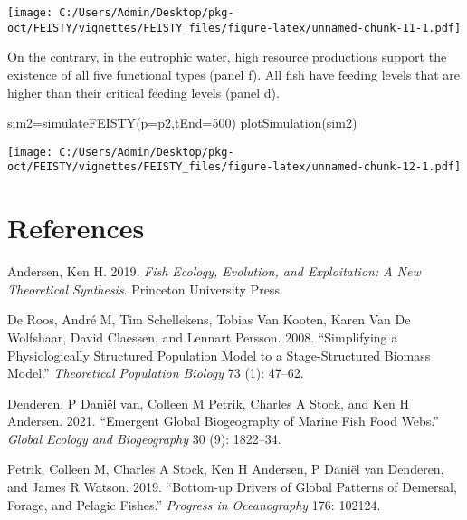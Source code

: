 \documentclass[
]{article}
\newenvironment{Shaded}{\begin{snugshade}}{\end{snugshade}}
\newcommand{\AttributeTok}[1]{\textcolor[rgb]{0.77,0.63,0.00}{#1}}
\newcommand{\DecValTok}[1]{\textcolor[rgb]{0.00,0.00,0.81}{#1}}
\newcommand{\FunctionTok}[1]{\textcolor[rgb]{0.00,0.00,0.00}{#1}}
\newcommand{\NormalTok}[1]{#1}
\newcommand{\OtherTok}[1]{\textcolor[rgb]{0.56,0.35,0.01}{#1}}
\newlength{\cslhangindent}
\newlength{\cslentryspacingunit} %
\newenvironment{CSLReferences}[2] %
 {%
  \setlength{\parindent}{0pt}
  \ifodd #1
  \let\oldpar\par
  \def\par{\hangindent=\cslhangindent\oldpar}
  \fi
  \setlength{\parskip}{#2\cslentryspacingunit}
 }%
 {}
\begin{document}
\texttt{[image: C:/Users/Admin/Desktop/pkg-oct/FEISTY/vignettes/FEISTY\_files/figure-latex/unnamed-chunk-11-1.pdf]}

On the contrary, in the eutrophic water, high resource productions
support the existence of all five functional types (panel f). All fish
have feeding levels that are higher than their critical feeding levels
(panel d).

\begin{Shaded}
\begin{Highlighting}[]
\NormalTok{sim2}\OtherTok{=}\FunctionTok{simulateFEISTY}\NormalTok{(}\AttributeTok{p=}\NormalTok{p2,}\AttributeTok{tEnd=}\DecValTok{500}\NormalTok{)}
\FunctionTok{plotSimulation}\NormalTok{(sim2)}
\end{Highlighting}
\end{Shaded}

\texttt{[image: C:/Users/Admin/Desktop/pkg-oct/FEISTY/vignettes/FEISTY\_files/figure-latex/unnamed-chunk-12-1.pdf]}

\newpage

\hypertarget{references}{%
\section{References}\label{references}}



\hypertarget{refs}{}
\begin{CSLReferences}{1}{0}
\leavevmode{}%
Andersen, Ken H. 2019. \emph{Fish Ecology, Evolution, and Exploitation:
A New Theoretical Synthesis}. Princeton University Press.

\leavevmode{}%
De Roos, André M, Tim Schellekens, Tobias Van Kooten, Karen Van De
Wolfshaar, David Claessen, and Lennart Persson. 2008. {``Simplifying a
Physiologically Structured Population Model to a Stage-Structured
Biomass Model.''} \emph{Theoretical Population Biology} 73 (1): 47--62.

\leavevmode{}%
Denderen, P Daniël van, Colleen M Petrik, Charles A Stock, and Ken H
Andersen. 2021. {``Emergent Global Biogeography of Marine Fish Food
Webs.''} \emph{Global Ecology and Biogeography} 30 (9): 1822--34.

\leavevmode{}%
Petrik, Colleen M, Charles A Stock, Ken H Andersen, P Daniël van
Denderen, and James R Watson. 2019. {``Bottom-up Drivers of Global
Patterns of Demersal, Forage, and Pelagic Fishes.''} \emph{Progress in
Oceanography} 176: 102124.

\end{CSLReferences}
\end{document}
